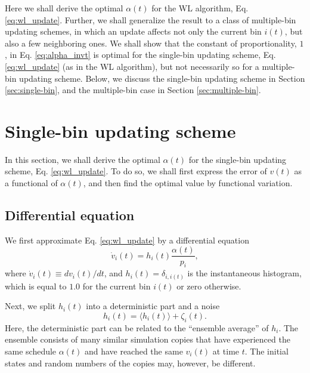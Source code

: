 \documentclass[reprint]{revtex4-1}
\begin{document}
Here we shall derive the optimal $\alpha(t)$
for the WL algorithm, Eq. \eqref{eq:wl_update}.
%
Further, we shall generalize the result
to a class of multiple-bin updating schemes,
in which an update affects
not only the current bin $i(t)$,
but also a few neighboring ones.
%
We shall show that
the constant of proportionality, $1$,
in Eq. \eqref{eq:alpha_invt}
is optimal for the single-bin updating scheme,
Eq. \eqref{eq:wl_update}
(as in the WL algorithm),
but not necessarily so
for a multiple-bin updating scheme.
%
Below, we discuss the single-bin updating scheme
in Section \ref{sec:single-bin},
and the multiple-bin case
in Section \ref{sec:multiple-bin}.



\section{\label{sec:single-bin}
Single-bin updating scheme}



In this section,
we shall derive the optimal $\alpha(t)$
for the single-bin updating scheme,
Eq. \eqref{eq:wl_update}.
%
To do so,
we shall first express the error of $v(t)$
as a functional of $\alpha(t)$,
and then find the optimal value
by functional variation.



\subsection{Differential equation}



We first approximate Eq. \eqref{eq:wl_update}
by a differential equation
%
\begin{equation}
  \dot v_i(t)
  =
  h_i(t) \frac{ \alpha(t) } { p_i },
  \label{eq:vt_diffeq}
\end{equation}
%
where
$\dot v_i(t) \equiv dv_i(t)/dt$,
%
and $h_i(t) = \delta_{i, i(t)}$
is the instantaneous histogram,
which is equal to $1.0$
for the current bin $i(t)$
or zero otherwise.



Next, we split $h_i(t)$ into a deterministic part
and a noise
%
\begin{equation}
  h_i(t) = \langle h_i(t) \rangle + \zeta_i(t).
  \label{eq:h_split}
\end{equation}
%
Here, the deterministic part can be related
to the ``ensemble average'' of $h_i$.
%
The ensemble consists of many similar simulation copies
that have experienced the same schedule $\alpha(t)$
and have reached the same $v_i(t)$
at time $t$.
%
The initial states and random numbers of the copies
may, however, be different.
\end{document}
